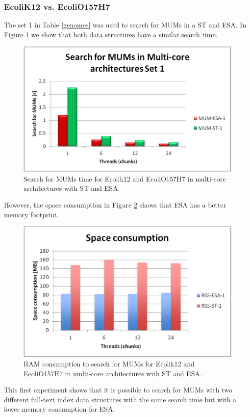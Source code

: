 \documentclass[runningheads,a4paper]{llncs}
\begin{document}
\subsubsection{EcoliK12 vs. EcoliO157H7}
The set 1 in Table \ref{genomes} was used to search for MUMs in a ST and ESA. In Figure \ref{fig:ecoli-mum} we show that both data structures have a similar search time.
\begin{figure}[h]
  \centering
  \includegraphics[scale=0.65]{ecoli-MUM.eps}
  \caption{Search for MUMs time for Ecolik12 and EcoliO157H7 in multi-core architectures with ST and ESA.}
  \label{fig:ecoli-mum}
\end{figure}  
However, the space consumption in Figure \ref{fig:ecoli-ram} shows that ESA has a better memory footprint.
\begin{figure}[h]
  \centering
  \includegraphics[scale=0.65]{ecoli-RAM.eps}
  \caption{RAM consumption to search for MUMs for Ecolik12 and EcoliO157H7 in multi-core architectures with ST and ESA.}
  \label{fig:ecoli-ram}
\end{figure}  
This first experiment shows that it is possible to search for MUMs with two different full-text index data structures with the same search time but with a lower memory consumption for ESA.
\end{document}
